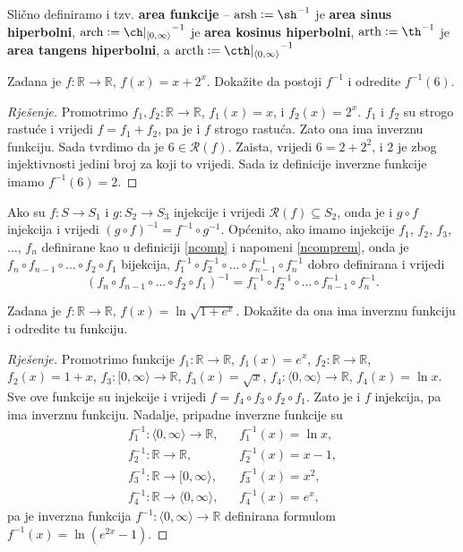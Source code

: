 Slično definiramo i tzv. \textbf{area funkcije} -- $\mathrm{arsh}:=\sh^{-1}$ je \textbf{area sinus hiperbolni}, $\mathrm{arch}:={\ch|_{[0, \infty\rangle}}^{-1}$ je \textbf{area kosinus hiperbolni}, $\mathrm{arth}:=\th^{-1}$ je \textbf{area tangens hiperbolni}, a $\mathrm{arcth}:={\cth|_{\langle 0, \infty\rangle}}^{-1}$
\begin{exercise}
Zadana je $f : \mathbb{R}\to \mathbb{R}$, $f(x)=x+2^x$. Dokažite da postoji $f^{-1}$ i odredite $f^{-1}(6)$.
\end{exercise}
\begin{proof}[Rješenje]
Promotrimo $f_1, f_2 : \mathbb{R}\to \mathbb{R}$, $f_1(x)=x$, i $f_2(x)=2^x$. $f_1$ i $f_2$ su strogo rastuće i vrijedi $f=f_1+f_2$, pa je i $f$ strogo rastuća. Zato ona ima inverznu funkciju. Sada tvrdimo da je $6\in \mathcal{R}(f)$. Zaista, vrijedi $6=2+2^2$, i $2$ je zbog injektivnosti jedini broj za koji to vrijedi. Sada iz definicije inverzne funkcije imamo $f^{-1}(6)=2$.
\end{proof}
\begin{remark}
Ako su $f : S\to S_1$ i $g : S_2 \to S_3$ injekcije i vrijedi $\mathcal{R}(f)\subseteq S_2$, onda je i $g\circ f$ injekcija i vrijedi $(g\circ f)^{-1}=f^{-1}\circ g^{-1}$. Općenito, ako imamo injekcije $f_1$, $f_2$, $f_3$, $\dots$, $f_n$ definirane kao u definiciji \ref{ncomp} i napomeni \ref{ncomprem}, onda je $f_n\circ f_{n-1}\circ\dots\circ f_2\circ f_1$ bijekcija, $f_1^{-1}\circ f_2^{-1}\circ \dots \circ f_{n-1}^{-1}\circ f_n^{-1}$ dobro definirana i vrijedi
$$(f_n\circ f_{n-1}\circ\dots\circ f_2\circ f_1)^{-1}=f_1^{-1}\circ f_2^{-1}\circ \dots \circ f_{n-1}^{-1}\circ f_n^{-1}.$$
\end{remark}
\begin{exercise}
Zadana je $f : \mathbb{R}\to \mathbb{R}$, $f(x)=\ln{\sqrt{1+e^x}}$. Dokažite da ona ima inverznu funkciju i odredite tu funkciju.
\end{exercise}
\begin{proof}[Rješenje]
Promotrimo funkcije $f_1: \mathbb{R}\to \mathbb{R}$, $f_1(x)=e^x$, $f_2 : \mathbb{R}\to \mathbb{R}$, $f_2(x)=1+x$, $f_3 : [ 0,\infty\rangle\to \mathbb{R}$, $f_3(x)=\sqrt{x}$, $f_4 : \langle 0,\infty\rangle\to \mathbb{R}$, $f_4(x)=\ln{x}$. Sve ove funkcije su injekcije i vrijedi $f=f_4\circ f_3\circ f_2\circ f_1$. Zato je i $f$ injekcija, pa ima inverznu funkciju. Nadalje, pripadne inverzne funkcije su
\begin{align*}
f_1^{-1} : \langle 0, \infty\rangle\to \mathbb{R},&\;\;\; f_1^{-1}(x)=\ln{x},\\
f_2^{-1} : \mathbb{R}\to \mathbb{R},&\;\;\; f_2^{-1}(x)=x-1,\\
f_3^{-1} : \mathbb{R}\to [0, \infty\rangle,&\;\;\; f_3^{-1}(x)=x^2,\\
f_4^{-1} : \mathbb{R}\to \langle 0, \infty\rangle,&\;\;\; f_4^{-1}(x)=e^x,
\end{align*}
pa je inverzna funkcija $f^{-1} : \langle 0,\infty\rangle\to \mathbb{R}$ definirana formulom $f^{-1}(x)=\ln(e^{2x}-1)$.
\end{proof}

